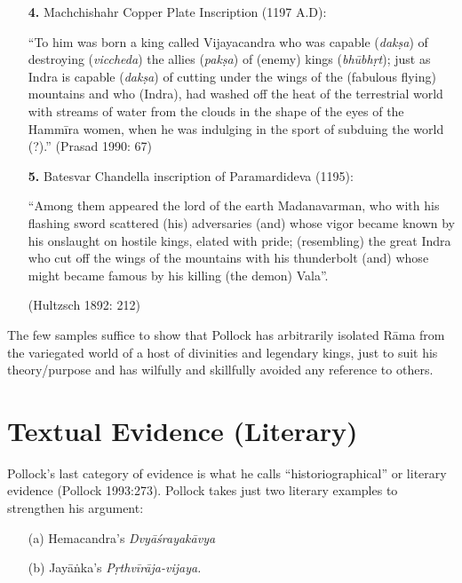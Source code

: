 \begin{itemize}
\item[{\bf 4.}] Machchishahr Copper Plate Inscription (1197 A.D): 

“To him was born a king called Vijayacandra who was capable ({\sl dakṣa}) of destroying ({\sl viccheda}) the allies ({\sl pakṣa}) of (enemy) kings ({\sl bhūbhṛt}); just as Indra is capable ({\sl dakṣa}) of cutting under the wings of the (fabulous flying) mountains and who (Indra), had washed off the heat of the terrestrial world with streams of water from the clouds in the shape of the eyes of the Hammīra women, when he was indulging in the sport of subduing the world (?).”
\hfill (Prasad 1990: 67)

\item[{\bf 5.}] Batesvar Chandella inscription of Paramardideva (1195): 

“Among them appeared the lord of the earth Madanavarman, who with his flashing sword scattered (his) adversaries (and) whose vigor became known by his onslaught on hostile kings, elated with pride; (resembling) the great Indra who cut off the wings of the mountains with his thunderbolt (and) whose might became famous by his killing (the demon) Vala”.

\hfill (Hultzsch 1892: 212)
\end{itemize}

The few samples suffice to show that Pollock has arbitrarily isolated Rāma from the variegated world of a host of divinities and legendary kings, just to suit his theory/purpose and has wilfully and skillfully avoided any reference to others. 

\section{Textual Evidence (Literary)}\label{sec3.3}

Pollock’s last category of evidence is what he calls “historiographical” or literary evidence (Pollock 1993:273). Pollock takes just two literary examples to strengthen his argument: 
\begin{itemize}
\item[(a)] Hemacandra’s {\sl Dvyāśrayakāvya}
\item[(b)] Jayāṅka’s {\sl Pṛthvīrāja-vijaya.}
\end{itemize}

